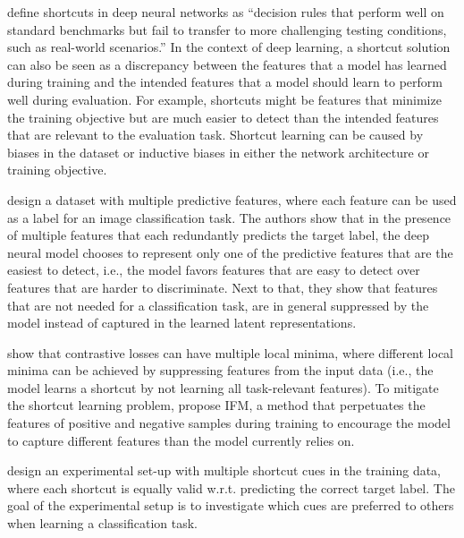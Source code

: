 \cite{geirhos2020shortcut} define shortcuts in deep neural networks as ``decision rules that perform well on standard benchmarks but fail to transfer to more challenging testing conditions, such as real-world scenarios.''
In the context of deep learning, a shortcut solution can also be seen as a discrepancy between the features that a model has learned during training and the intended features that a model should learn to perform well during evaluation. 
For example, shortcuts might be features that minimize the training objective but are much easier to detect than the intended features that are relevant to the evaluation task.
Shortcut learning can be caused by biases in the dataset or inductive biases in either the network architecture or training objective.

\cite{hermann2020what} design a dataset with multiple predictive features, where each feature can be used as a label for an image classification task.
The authors show that in the presence of multiple features that each redundantly predicts the target label, the deep neural model chooses to represent only one of the predictive features that are the easiest to detect, i.e., the model favors features that are easy to detect over features that are harder to discriminate.
Next to that, they show that features that are not needed for a classification task, are in general suppressed by the model instead of captured in the learned latent representations.

\cite{robinson2021can} show that contrastive losses can have multiple local minima, where different local minima can be achieved by suppressing features from the input data (i.e., the model learns a shortcut by not learning all task-relevant features). 
To mitigate the shortcut learning problem, \cite{robinson2021can} propose \acl{IFM}, a method that perpetuates the features of positive and negative samples during training to encourage the model to capture different features than the model currently relies on. 

\cite{scimeca2022which} design an experimental set-up with multiple shortcut cues in the training data, where each shortcut is equally valid w.r.t. predicting the correct target label. The goal of the experimental setup is to investigate which cues are preferred to others when learning a classification task.  


